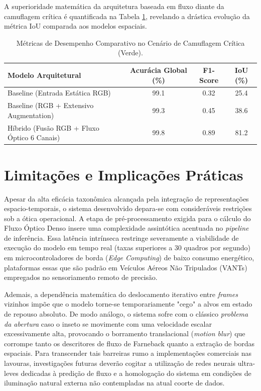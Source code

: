 A superioridade matemática da arquitetura baseada em fluxo diante da camuflagem crítica é quantificada na Tabela \ref{tab:metricas_desempenho}, revelando a drástica evolução da métrica IoU comparada aos modelos espaciais.

\begin{table}[htb]
    \centering
    \caption{Métricas de Desempenho Comparativo no Cenário de Camuflagem Crítica (Verde).}
    \label{tab:metricas_desempenho}
    \begin{tabular}{lccc}
        \toprule
        \textbf{Modelo Arquitetural} & \textbf{Acurácia Global (\%)} & \textbf{F1-Score} & \textbf{IoU (\%)} \\
        \midrule
        Baseline (Entrada Estática RGB) & 99.1 & 0.32 & 25.4 \\
        Baseline (RGB + Extensivo Augmentation) & 99.3 & 0.45 & 38.6 \\
        Híbrido (Fusão RGB + Fluxo Óptico 6 Canais) & 99.8 & 0.89 & 81.2 \\
        \bottomrule
    \end{tabular}
\end{table}

\section{Limitações e Implicações Práticas}
\label{sec:limitacoes}

Apesar da alta eficácia taxonômica alcançada pela integração de representações espacio-temporais, o sistema desenvolvido depara-se com consideráveis restrições sob a ótica operacional. A etapa de pré-processamento exigida para o cálculo do Fluxo Óptico Denso insere uma complexidade assintótica acentuada no \textit{pipeline} de inferência. Essa latência intrínseca restringe severamente a viabilidade de execução do modelo em tempo real (taxas superiores a 30 quadros por segundo) em microcontroladores de borda (\textit{Edge Computing}) de baixo consumo energético, plataformas essas que são padrão em Veículos Aéreos Não Tripulados (VANTs) empregados no sensoriamento remoto de precisão.

Ademais, a dependência matemática do deslocamento iterativo entre \textit{frames} vizinhos impõe que o modelo torne-se temporariamente "cego" a alvos em estado de repouso absoluto. De modo análogo, o sistema sofre com o clássico \textit{problema da abertura} caso o inseto se movimente com uma velocidade escalar excessivamente alta, provocando o borramento translacional (\textit{motion blur}) que corrompe tanto os descritores de fluxo de Farneback quanto a extração de bordas espaciais. Para transcender tais barreiras rumo a implementações comerciais nas lavouras, investigações futuras deverão cogitar a utilização de redes neurais ultra-leves dedicadas à predição de fluxo e a homologação do sistema em condições de iluminação natural externa não contempladas na atual coorte de dados.
